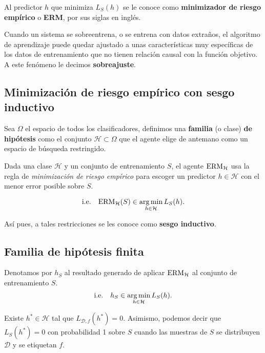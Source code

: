 \documentclass[8pt,a4paper]{extarticle}
\begin{document}
\begin{multicols}{3}
\begin{boxdef}
	Al predictor $h$ que minimiza $L_S (h)$ se le conoce como \textbf{minimizador de riesgo empírico} o \textbf{ERM}, por sus siglas en inglés.
\end{boxdef}

\begin{boxdef}[Sobreajuste]
	Cuando un sistema se sobreentrena, o se entrena con datos extraños, el algoritmo de aprendizaje puede quedar ajustado a unas características muy específicas de los datos de entrenamiento que no tienen relación causal con la función objetivo. A este fenómeno le decimos \textbf{sobreajuste}.
\end{boxdef}

\subsection{Minimización de riesgo empírico con sesgo inductivo}

\begin{boxdef}
Sea $\Omega$ el espacio de todos los clasificadores, definimos una \textbf{familia} (o clase) \textbf{de hipótesis} como el conjunto $\mathcal{H} \subset \Omega$ que el agente elige de antemano como un espacio de búsqueda restringido.
\end{boxdef}

Dada una clase $\mathcal{H}$ y un conjunto de entrenamiento $S$, el agente  $\text{\normalfont ERM}_{\mathcal{H}}$ usa la regla de \emph{minimización de riesgo empírico} para escoger un predictor $h \in \mathcal{H}$ con el menor error posible sobre $S$.

\[
	\text{\normalfont i.e.}\quad\text{\normalfont ERM}_{\mathcal{H}} (S) \in \operatorname*{\arg \min}_{h\in\mathcal{H}} L_S (h)
.\] 

Así pues, a tales restricciones se les conoce como \textbf{sesgo inductivo}.

\subsection{Familia de hipótesis finita}

\begin{boxrmk}[]
	Denotamos por $h_S$ al resultado generado de aplicar  $\text{\normalfont ERM}_{\mathcal{H}}$ al conjunto de entrenamiento $S$.
	\[
		\text{\normalfont i.e.}\quad h_S \in \operatorname*{\arg \min}_{h \in \mathcal{H}} L_S (h)
	.\]
\end{boxrmk}

\begin{boxdef}
	Existe $h^* \in \mathcal{H}$ tal que $L_{\mathcal{D}, f} (h^*) = 0$. Asimismo, podemos decir que $L_S (h^*) = 0$ con probabilidad 1 sobre  $S$ cuando las muestras de $S$ se distribuyen  $\mathcal{D}$ y se etiquetan $f$.
\end{boxdef}


\end{multicols}
\end{document}
